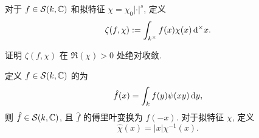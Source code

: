 对于 $f\in{\mathcal{S}}(k,{\mathbb{C}})$ 和拟特征 $\chi=\chi_0|\cdot|^s$, 定义
	\[\zeta(f,\chi):=\int_{k^\times}f(x)\chi(x)\mathop{}\!\mathrm{d}^\times x.\]
	
\begin{exercise}
证明 $\zeta(f,\chi)$ 在 $\Re(\chi)>0$ 处绝对收敛.
\end{exercise}
%
%
%
%

定义 $f\in{\mathcal{S}}(k,{\mathbb{C}})$ 的为
	\[\hat f(x)=\int_k f(y)\psi(xy)\mathop{}\!\mathrm{d} y,\]
则 $\hat f\in{\mathcal{S}}(k,{\mathbb{C}})$, 且 $\hat f$ 的傅里叶变换为 $f(-x)$.
对于拟特征 $\chi$, 定义
	\[\hat\chi(x)=|x|\chi^{-1}(x).\]

